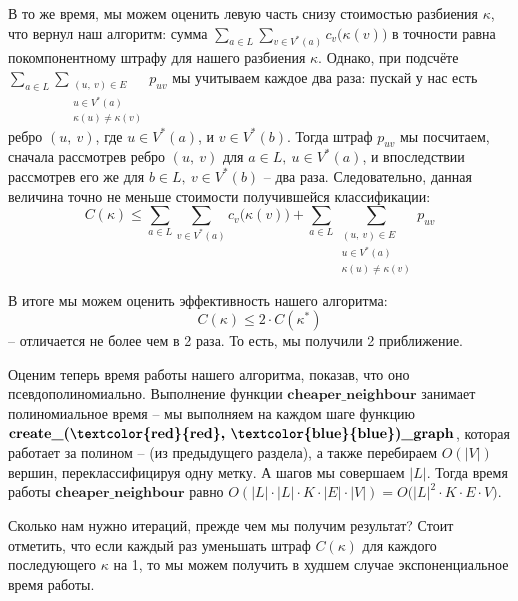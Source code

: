 \documentclass[a4paper,12pt]{article}
\begin{document}
В то же время, мы можем оценить левую часть снизу стоимостью разбиения $\kappa$, что вернул наш алгоритм: сумма $\displaystyle\sum\limits_{a \in L}\sum\limits_{v \in V^*(a)}c_v\big(\kappa(v)\big)$ в точности равна покомпонентному штрафу для нашего разбиения $\kappa$. Однако, при подсчёте $\displaystyle\sum\limits_{a \in L}\displaystyle\sum\limits_{\substack{(u,\ v)\in E\\u \in V^*(a)\\ \kappa(u)\neq \kappa(v)}}p_{uv}$ мы учитываем каждое два раза: пускай у нас есть ребро $(u,\ v)$, где $u \in V^*(a)$, и $v \in V^*(b)$. Тогда штраф $p_{uv}$ мы посчитаем, сначала рассмотрев ребро $(u,\ v)$ для $a \in L,\ u \in V^*(a)$, и впоследствии рассмотрев его же для $b \in L,\ v \in V^*(b)$ -- два раза. Следовательно, данная величина точно не меньше стоимости получившейся классификации:
\[C(\kappa) \leqslant \sum\limits_{a \in L}\sum\limits_{v \in V^*(a)}c_v\big(\kappa(v)\big) + \sum\limits_{a \in L}\displaystyle\sum\limits_{\substack{(u,\ v)\in E\\u \in V^*(a)\\ \kappa(u)\neq \kappa(v)}}p_{uv}\]

В итоге мы можем оценить эффективность нашего алгоритма:
\[C(\kappa) \leqslant 2 \cdot C(\kappa^*)\] -- отличается не более чем в 2 раза. То есть, мы получили 2 приближение.

Оценим теперь время работы нашего алгоритма, показав, что оно псевдополиномиально. Выполнение функции $\textbf{cheaper\_neighbour}$ занимает полиномиальное время -- мы выполняем на каждом шаге функцию $\textbf{create\_(\textcolor{red}{red},\ \textcolor{blue}{blue})\_graph}$, которая работает за полином -- (из предыдущего раздела), а также перебираем $O(|V|)$ вершин, переклассифицируя одну метку. А шагов мы совершаем $|L|$. Тогда время работы $\textbf{cheaper\_neighbour}$ равно $O(|L| \cdot |L| \cdot K \cdot |E| \cdot |V|) = O\big(|L|^2 \cdot K \cdot E \cdot V\big)$.

Сколько нам нужно итераций, прежде чем мы получим результат? Стоит отметить, что если каждый раз уменьшать штраф $C(\kappa)$ для каждого последующего $\kappa$ на 1, то мы можем получить в худшем случае экспоненциальное время работы.
\end{document}

